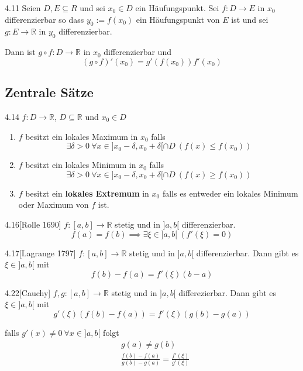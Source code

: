 \documentclass[8pt,a4paper,twocolumn,table]{extarticle}
\newcommand{\R}{\mathbb{R}}
\begin{document}
\begin{satz}{4.11}
    Seien $D, E \subseteq R$ und sei $x_0 \in D$ ein Häufungspunkt. Sei $f: D \to E$ in $x_0$ differenzierbar
    so dass $y_0 := f(x_0)$ ein Häufungspunkt von $E$ ist und sei $g: E \to \R$ in $y_0$ differenzierbar.

    Dann ist $g \circ f: D \to \R$ in $x_0$ differenzierbar und
    \[ (g \circ f)'(x_0) = g'(f(x_0))f'(x_0) \]
\end{satz}

\subsection{Zentrale Sätze}

\begin{definition}{4.14}
    $f: D \to \R$, $D \subseteq \R$ und $x_0 \in D$
    \begin{enumerate}
        \item $f$ besitzt ein lokales Maximum in $x_0$ falls
              \[
                  \exists \delta > 0\ \forall x \in ]x_0 - \delta, x_0 + \delta[ \cap D\ \left( f(x) \le f(x_0) \right)
              \]
        \item $f$ besitzt ein lokales Minimum in $x_0$ falls
              \[
                  \exists \delta > 0\ \forall x \in ]x_0 - \delta, x_0 + \delta[ \cap D\ \left( f(x) \ge f(x_0) \right)
              \]
        \item $f$ besitzt ein \textbf{lokales Extremum} in $x_0$ falls es entweder ein lokales Minimum oder Maximum von $f$ ist.
    \end{enumerate}
\end{definition}

\begin{satz}{4.16}[Rolle 1690]
    $f: [a, b] \to \R$ stetig und in $]a, b[$ differenzierbar.
            \[ f(a) = f(b) \implies \exists \xi \in ]a, b[\ \left( f'(\xi) = 0 \right) \]
\end{satz}

\begin{satz}{4.17}[Lagrange 1797]
    $f: [a, b] \to \R$ stetig und in $]a, b[$ differenzierbar. Dann gibt es $\xi \in ]a, b[$ mit
    \[ f(b) - f(a) = f'(\xi)(b - a) \]
\end{satz}

\begin{satz}{4.22}[Cauchy]
    $f,g : [a,b] \to \R$ stetig und in $]a, b[$ differezierbar.
                    Dann gibt es $\xi \in ]a, b[$ mit
                    \[ g'(\xi)(f(b) - f(a)) = f'(\xi)(g(b) - g(a)) \]

                    falls $g'(x) \ne 0\ \forall x \in ]a, b[$ folgt
    \begin{align*}
         & g(a) \ne g(b)                                             \\
         & \frac{f(b) - f(a)}{g(b) - g(a)} = \frac{f'(\xi)}{g'(\xi)}
    \end{align*}
\end{satz}
\end{document}
